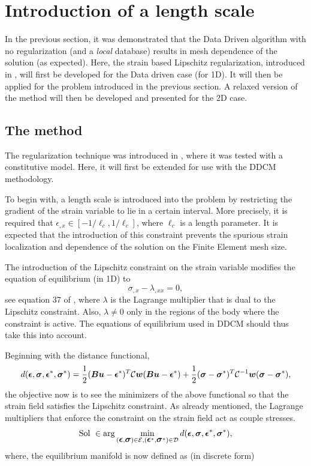 \documentclass[12pt]{elsarticle}
\begin{document}
\section{Introduction of a length scale}

In the previous section, it was demonstrated that the Data Driven algorithm with no regularization (and a \textit{local} database) results in mesh dependence of the solution (as expected). Here, the strain based Lipschitz regularization, introduced in \cite{Kamasamudram}, will first be developed for the Data driven case (for 1D). It will then be applied for the problem introduced in the previous section. A relaxed version of the method will then be developed and presented for the 2D case.

\subsection{The method}
The regularization technique was introduced in \cite{mylipsc}, where it was tested with a constitutive model. Here, it will first be extended for use with the DDCM methodology.

To begin with, a length scale is introduced into the problem by restricting the gradient of the strain variable to lie in a certain interval. More precisely, it is required that $\epsilon_{,x} \in [-1/{\ell_c}, 1/{\ell_c} ]$, where $\ell_c$ is a length parameter. It is expected that the introduction of this constraint prevents the spurious strain localization and dependence of the solution on the Finite Element mesh size. 


The introduction of the Lipschitz constraint on the strain variable modifies the equation of equilibrium (in 1D) to 
\begin{equation}
	\sigma_{,x}- \lambda_{,xx}=0,\label{equil_couple_1D}
\end{equation}
see equation 37 of \cite{Kamasamudram2023s}, where $\lambda$ is the Lagrange multiplier that is dual to the Lipschitz constraint. Also, $\lambda \neq 0$ only in the regions of the body where the constraint is active. The equations of equilibrium used in DDCM should thus take this into account. 

Beginning with the distance functional,
\begin{equation}
	d(\mbox{\boldmath $\epsilon$},\mbox{\boldmath $\sigma$},\mbox{\boldmath $\epsilon$}^*,\mbox{\boldmath $\sigma$}^*) = \frac{1}{2}(\mbox{\boldmath $B$} \mbox{\boldmath $u$} - \mbox{\boldmath $\epsilon$}^*)^T\mathcal{C}\mbox{\boldmath $w$}(\mbox{\boldmath $B$} \mbox{\boldmath $u$} - \mbox{\boldmath $\epsilon$}^*) + \frac{1}{2}(\mbox{\boldmath $\sigma$} - \mbox{\boldmath $\sigma$}^*)^T\mathcal{C}^{-1}\mbox{\boldmath $w$}(\mbox{\boldmath $\sigma$} - \mbox{\boldmath $\sigma$}^*),
\end{equation}
the objective now is to see the minimizers of the above functional so that the strain field satisfies the Lipschitz constraint. As already mentioned, the Lagrange multipliers that enforce the constraint on the strain field act as couple stresses.
\begin{equation}
	\text{Sol } \in \arg \min_{(\mbox{\boldmath $\epsilon$},\mbox{\boldmath $\sigma$}) \in \mathcal{E}, (\mbox{\boldmath $\epsilon$}^*,\mbox{\boldmath $\sigma$}^*) \in \mathcal{D}} d(\mbox{\boldmath $\epsilon$},\mbox{\boldmath $\sigma$},\mbox{\boldmath $\epsilon$}^*,\mbox{\boldmath $\sigma$}^*),
\end{equation}
where, the equilibrium manifold is now defined as (in discrete form)
 
\end{document}

